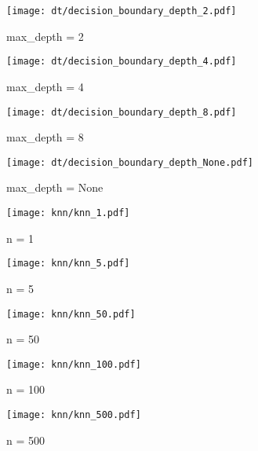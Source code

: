 \documentclass[acmconf,nonacm=true]{acmart}
\begin{document}
\begin{figure}[H]
    \centering
    \texttt{[image: dt/decision\_boundary\_depth\_2.pdf]}
    \caption{max\_depth = 2}
\end{figure}

\begin{figure}[H]
    \centering
    \texttt{[image: dt/decision\_boundary\_depth\_4.pdf]}
    \caption{max\_depth = 4}
\end{figure}

\begin{figure}[H]
    \centering  
    \texttt{[image: dt/decision\_boundary\_depth\_8.pdf]}
    \caption{max\_depth = 8}
\end{figure}

\begin{figure}[H]
    \centering  
    \texttt{[image: dt/decision\_boundary\_depth\_None.pdf]}
    \caption{max\_depth = None}
\end{figure}

\begin{figure}[H]
    \centering
    \texttt{[image: knn/knn\_1.pdf]}
    \caption{n = 1}
\end{figure}

\begin{figure}[H]
    \centering
    \texttt{[image: knn/knn\_5.pdf]}
    \caption{n = 5}
\end{figure}

\begin{figure}[H]
    \centering
    \texttt{[image: knn/knn\_50.pdf]}
    \caption{n = 50}
\end{figure}

\begin{figure}[H]
    \centering
    \texttt{[image: knn/knn\_100.pdf]}
    \caption{n = 100}
\end{figure}

\begin{figure}[H]
    \centering
    \texttt{[image: knn/knn\_500.pdf]}
    \caption{n = 500}
\end{figure}
\end{document}
